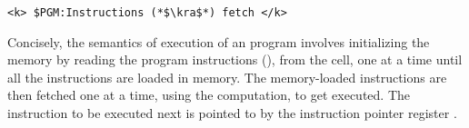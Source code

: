 \begin{lstlisting}[style=KRULE]
           <k> $PGM:Instructions (*$\kra$*) fetch </k>
\end{lstlisting}


Concisely, the semantics of execution of an \ISA program involves initializing the memory by reading the program instructions (), from the  cell, one at a time until all the instructions are loaded in memory. The memory-loaded instructions are then fetched one at a time, using the  computation, to get executed. The instruction to be executed next is pointed to by the instruction pointer register .  

